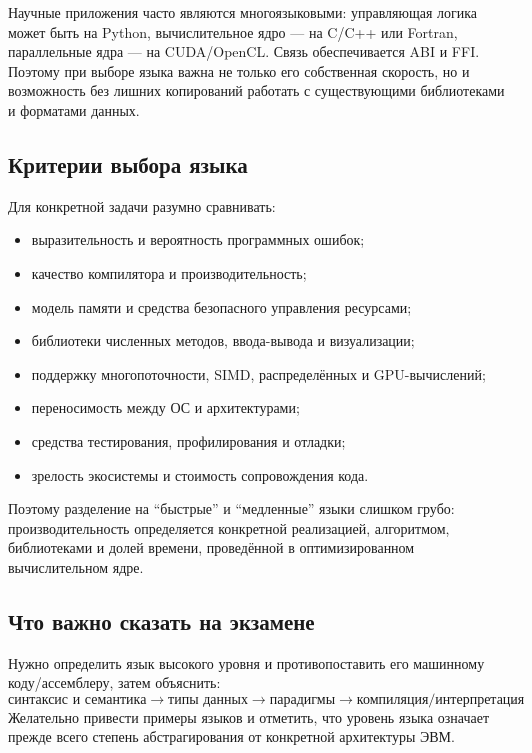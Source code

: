 Научные приложения часто являются многоязыковыми: управляющая логика может быть
на Python, вычислительное ядро --- на C/C++ или Fortran, параллельные ядра --- на
CUDA/OpenCL. Связь обеспечивается ABI и FFI. Поэтому при выборе языка важна не
только его собственная скорость, но и возможность без лишних копирований
работать с существующими библиотеками и форматами данных.

\subsection{Критерии выбора языка}

Для конкретной задачи разумно сравнивать:
\begin{itemize}
    \item выразительность и вероятность программных ошибок;
    \item качество компилятора и производительность;
    \item модель памяти и средства безопасного управления ресурсами;
    \item библиотеки численных методов, ввода-вывода и визуализации;
    \item поддержку многопоточности, SIMD, распределённых и GPU-вычислений;
    \item переносимость между ОС и архитектурами;
    \item средства тестирования, профилирования и отладки;
    \item зрелость экосистемы и стоимость сопровождения кода.
\end{itemize}

Поэтому разделение на ``быстрые'' и ``медленные'' языки слишком грубо:
производительность определяется конкретной реализацией, алгоритмом, библиотеками
и долей времени, проведённой в оптимизированном вычислительном ядре.


\subsection{Что важно сказать на экзамене}

Нужно определить язык высокого уровня и противопоставить его машинному коду/ассемблеру, затем объяснить:
\[
\boxed{\text{синтаксис и семантика}
\rightarrow
\text{типы данных}
\rightarrow
\text{парадигмы}
\rightarrow
\text{компиляция/интерпретация}}.
\]
Желательно привести примеры языков и отметить, что уровень языка означает прежде всего степень абстрагирования от конкретной архитектуры ЭВМ.

\newpage
